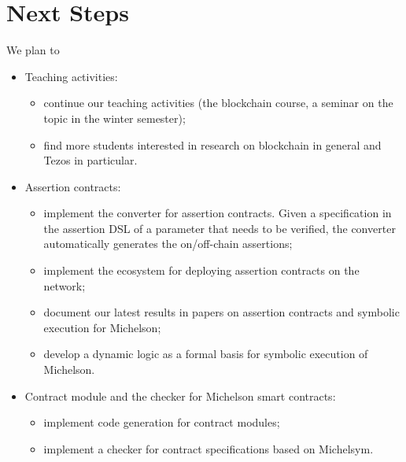 \documentclass[a4paper,11pt]{article}
\begin{document}
\section{Next Steps}
 
We plan to 
\begin{itemize}
\item Teaching activities:
\begin{itemize}
\item continue our teaching activities (the blockchain course, a seminar on the topic in the winter semester);
\item find more students interested in research on blockchain in general and Tezos in particular.
\end{itemize}
\item Assertion contracts:
\begin{itemize}
\item implement the converter for assertion contracts. Given a specification in the assertion DSL of a parameter that needs to be verified, the converter automatically generates the on/off-chain assertions;
\item implement the ecosystem for deploying assertion contracts on the network; 
\item document our latest results in papers on assertion contracts and symbolic execution for Michelson;
\item develop a dynamic logic as a formal basis for symbolic execution of Michelson.
\end{itemize}

\item Contract module and the checker for Michelson smart contracts:
\begin{itemize}
\item implement code generation for contract modules; 
\item implement a checker for contract specifications based on Michelsym.
\end{itemize}

\end{itemize}





\end{document}
